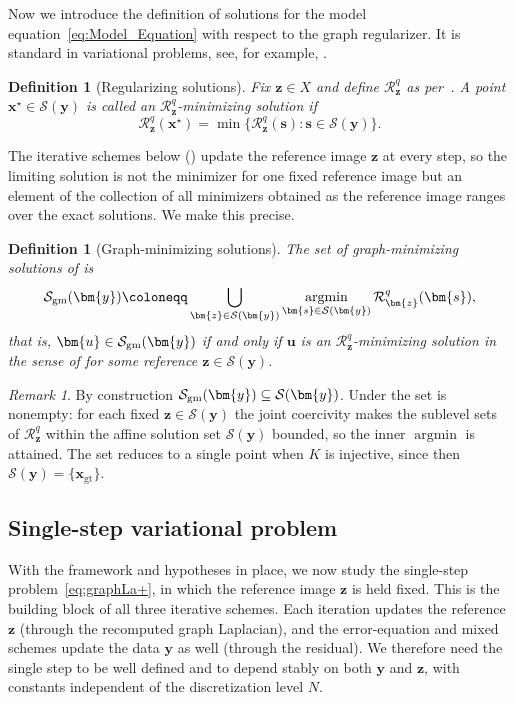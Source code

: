 \documentclass{article}
\newtheorem{definition}[theorem]{Definition}
\theoremstyle{remark}
\newtheorem{remark}[theorem]{Remark}
\newcommand{\gt}{\bm{x}_{\mathrm{gt}}}
\newcommand{\Rreg}{\mathcal{R}}
\newcommand{\Ssol}{\mathcal{S}}
\newcommand{\bx}{{\bm{x}}}
\newcommand{\by}{{\bm{y}}}
\newcommand{\bz}{{\bm{z}}}
\newcommand{\bu}{{\bm{u}}}
\newcommand{\bs}{{\bm{s}}}
\begin{document}
Now we introduce the definition of solutions for the model equation~\cref{eq:Model_Equation} with respect to the graph regularizer. It is standard in variational problems, see, for example, \cite[Definition~3.24]{scherzer2009variational}.

\begin{definition}[Regularizing solutions]\label{def:R-min-solution}
Fix $\bz\in X$ and define $\Rreg_\bz^q$ as per~. A point $\bx^\star\in \Ssol(\by)$ is called an $\Rreg_\bz^q$-minimizing solution if
\begin{equation*}
\Rreg_\bz^q(\bx^\star)
=\min\{\Rreg_\bz^q(\bs):\bs\in\Ssol(\by)\}.
\end{equation*}
\end{definition}

The iterative schemes below () update the reference image $\bz$ at every step, so the
limiting solution is not the minimizer for one fixed reference image but an
element of the collection of all minimizers obtained as the reference image
ranges over the exact solutions. We make this precise.

\begin{definition}[Graph-minimizing solutions]\label{def:Sgm}
The set of \emph{graph-minimizing solutions} of  is
\begin{equation}\label{eq:Sgm-def}
\mathcal S_{\rm gm}(\by)
\coloneqq
\bigcup_{\bz\in\Ssol(\by)}
\operatorname*{argmin}_{\bs\in\Ssol(\by)}\Rreg_\bz^q(\bs),
\end{equation}
that is, $\bu\in\mathcal S_{\rm gm}(\by)$ if and only if $\bu$ is an
$\Rreg_\bz^q$-minimizing solution in the sense of  for
some reference $\bz\in\Ssol(\by)$.
\end{definition}

\begin{remark}\label{rem:Sgm}
   By construction $\mathcal S_{\rm gm}(\by)\subseteq\Ssol(\by)$. Under
 the set is
nonempty: for each fixed $\bz\in\Ssol(\by)$ the joint coercivity
 makes the sublevel sets of $\Rreg_\bz^q$ within the
affine solution set $\Ssol(\by)$ bounded, so the inner $\operatorname*{argmin}$
is attained. The set reduces to a single point when $K$ is injective, since then
$\Ssol(\by)=\{\gt\}$. 
\end{remark}

\subsection{Single-step variational problem}\label{ssec:fixed-graph}
With the framework and hypotheses in place, we now study the single-step
problem~\cref{eq:graphLa+}, in which the reference image $\bz$ is held fixed.
This is the building block of all three iterative schemes. Each iteration updates
the reference $\bz$ (through the recomputed graph Laplacian), and the
error-equation and mixed schemes update the data $\by$ as well (through the
residual). We therefore need the single step to be well defined and to depend stably on both
$\by$ and $\bz$, with constants independent of the discretization level $N$.
\end{document}
